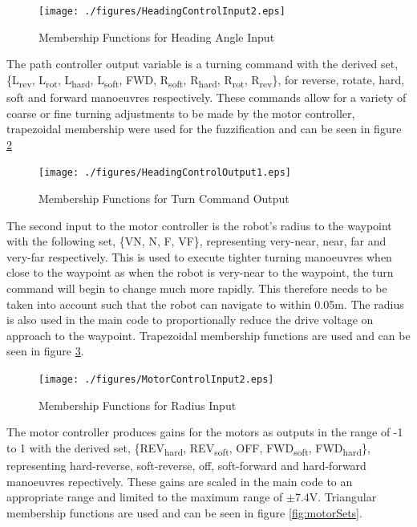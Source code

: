 \documentclass[10pt]{article}
\begin{document}
\begin{figure}[H]
    \centering
\texttt{[image: ./figures/HeadingControlInput2.eps]}
\caption{Membership Functions for Heading Angle Input}
\label{fig:headingSets}
\end{figure}

The path controller output variable is a turning command with the derived set, 
\{L\textsubscript{rev}, L\textsubscript{rot}, L\textsubscript{hard}, L\textsubscript{soft}, FWD, R\textsubscript{soft}, R\textsubscript{hard}, R\textsubscript{rot}, R\textsubscript{rev}\},
for reverse, rotate, hard, soft and forward manoeuvres respectively. 
These commands allow for a variety of coarse or fine turning adjustments to be made by the motor controller, trapezoidal membership were used for the fuzzification and can be seen in figure \ref{fig:commandSets}
\begin{figure}[H]
    \centering
\texttt{[image: ./figures/HeadingControlOutput1.eps]}
\caption{Membership Functions for Turn Command Output}
\label{fig:commandSets}
\end{figure}

The second input to the motor controller is the robot's radius to the waypoint with the following set, \{VN, N, F, VF\}, representing very-near, near, far and very-far respectively.
This is used to execute tighter turning manoeuvres when close to the waypoint as when the robot is very-near to the waypoint, the turn command will begin to change much more rapidly.
This therefore needs to be taken into account such that the robot can navigate to within 0.05m.
The radius is also used in the main code to proportionally reduce the drive voltage on approach to the waypoint.
Trapezoidal membership functions are used and can be seen in figure \ref{fig:radiusSets}.

\begin{figure}[H]
    \centering
\texttt{[image: ./figures/MotorControlInput2.eps]}
\caption{Membership Functions for Radius Input}
\label{fig:radiusSets}
\end{figure}

The motor controller produces gains for the motors as outputs in the range of -1 to 1 with the derived set, \{REV\textsubscript{hard}, REV\textsubscript{soft}, OFF, FWD\textsubscript{soft}, FWD\textsubscript{hard}\},
representing hard-reverse, soft-reverse, off, soft-forward and hard-forward manoeuvres repectively. 
These gains are scaled in the main code to an appropriate range and limited to the maximum range of $\pm$7.4V. 
Triangular membership functions are used and can be seen in figure \ref{fig:motorSets}.
\end{document}
